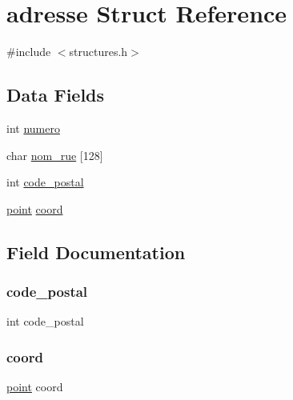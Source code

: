 \hypertarget{structadresse}{}\section{adresse Struct Reference}
\label{structadresse}


{\ttfamily \#include $<$structures.\+h$>$}

\subsection*{Data Fields}
\begin{DoxyCompactItemize}
\item 
int \hyperlink{structadresse_a2c30f43104974e72e2809fb4569804b0}{numero}
\item 
char \hyperlink{structadresse_a5aafcf02ad3be5a371655c227684be8e}{nom\+\_\+rue} \mbox{[}128\mbox{]}
\item 
int \hyperlink{structadresse_ace76748bee695a3ec62ff48ac876ebc2}{code\+\_\+postal}
\item 
\hyperlink{structpoint}{point} \hyperlink{structadresse_a16be187ac405f3bb61930a342b444253}{coord}
\end{DoxyCompactItemize}


\subsection{Field Documentation}
\hypertarget{structadresse_ace76748bee695a3ec62ff48ac876ebc2}{}\label{structadresse_ace76748bee695a3ec62ff48ac876ebc2} 
\subsubsection{\texorpdfstring{code\+\_\+postal}{code\_postal}}
{\footnotesize\ttfamily int code\+\_\+postal}

\hypertarget{structadresse_a16be187ac405f3bb61930a342b444253}{}\label{structadresse_a16be187ac405f3bb61930a342b444253} 
\subsubsection{\texorpdfstring{coord}{coord}}
{\footnotesize\ttfamily \hyperlink{structpoint}{point} coord}

\hypertarget{structadresse_a5aafcf02ad3be5a371655c227684be8e}{}\label{structadresse_a5aafcf02ad3be5a371655c227684be8e} 
